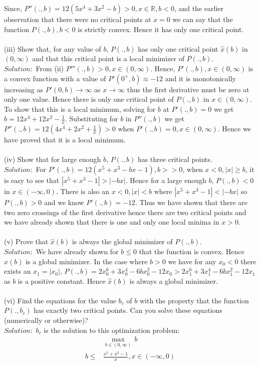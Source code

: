 \documentclass[12pt]{report}
\begin{document}
Since, $P''(.,b) = 12(5x^4+3x^2-b)>0, x\in \mathbb{R}, b<0$, and the earlier observation that there were no critical points at
$x=0$ we can say that the function $P(.,b), b<0$ is strictly convex. Hence it has only one critical point.
\\
\\
(iii) Show that, for any value of $b$, $P(.,b)$ has only one critical point $\hat{x}(b)$ in $(0,\infty)$ and that this critical
point is a local minimizer of $P (., b)$.\\
$Solution:$ From (ii) $P'''(., b)>0, x\in (0,\infty)$. Hence, $P'(.,b),x\in (0,\infty)$ is a convex function with a value of
$P'(0^+,b)\approx-12$ and it is monotonically increasing as $P'(0,b)\to \infty$ as $x\to \infty$ thus the first derivative must be
zero at only one value. Hence there is only one critical point of $P(.,b)$ in $x\in (0,\infty)$. To show that this is a local
minimum, solving for $b$ at $P'(., b)=0$ we get $b=12x^4+12x^2-\frac{1}{x}$. Substituting for $b$ in $P''(., b)$ we get
$P''(., b)=12(4x^4+2x^2+\frac{1}{x}) > 0 $ when $P'(., b)=0, x \in (0,\infty)$. Hence we have proved that it is a local minimum.
\\
\\
(iv) Show that for large enough $b$, $P (., b)$ has three critical points.\\
$Solution:$ For $P'(.,b) = 12(x^5+x^3-bx-1), b>>0$, when $x<0, |x| \geq b$, it is easy to see that $|x^5+x^3-1|>|-bx|$. Hence for a
large enough $b$, $P(.,b)<0$ in $x\in (-\infty,0)$. There is also an $x<0, |x|<b$ where $|x^5+x^3-1|<|-bx|$ so $P(.,b)>0$ and we
know $P'(.,b) = -12$. Thus we have shown that there are two zero crossings of the first derivative hence there are two critical
points and we have already shown that there is one and only one local minima in $x>0$.
\\
\\
(v) Prove that $\hat{x}(b)$ is always the global minimizer of $P (., b)$.\\
$Solution:$ We have already shown for $b\leq 0$ that the function is convex. Hence $\hat{x}(b)$ is a global minimizer. In the case where $b>0$ we have for any $x_0<0$ there exists an $x_1=|x_0|$, $P(.,b) = 2x_0^6+3x_0^4-6bx_0^2-12x_0 > 2x_1^6+3x_1^4-6bx_1^2-12x_1 $ as $b$ is a positive constant. Hence $\hat{x}(b)$ is always a global minimizer.
\\
\\(vi) Find the equations for the value $b_c$ of $b$ with the property that the function $P (., b_c )$ has exactly two critical
 points. Can you solve these equations (numerically or otherwise)?
\\
$Solution:$ $b_c$ is the solution to this optimization problem:
\begin{align*}
&\max_{b\in (0,\infty )} \, b\\
b\leq & \frac{x^5+x^3-1}{x}, x \in (-\infty,0)
\end{align*}
\end{document}
